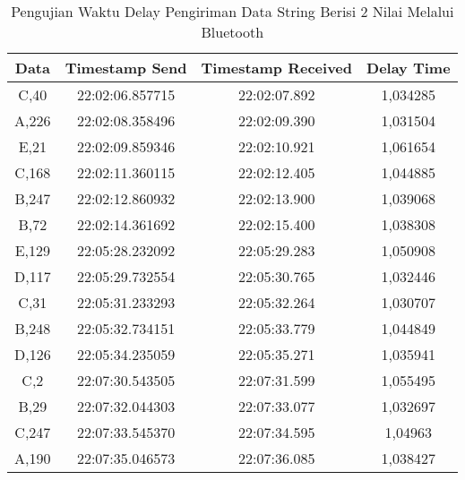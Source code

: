 \begin{table}[]
\centering
  \caption{Pengujian Waktu Delay Pengiriman Data String Berisi 2 Nilai Melalui Bluetooth}
  \label{tbl:delayBluetooth}
  \begin{tabular}{|ccc|c|}
  \hline
  \multicolumn{1}{|c|}{Data}  & \multicolumn{1}{c|}{Timestamp Send}  & Timestamp Received & Delay Time  \\ \hline
  \multicolumn{1}{|c|}{C,40}  & \multicolumn{1}{c|}{22:02:06.857715} & 22:02:07.892       & 1,034285    \\ \hline
  \multicolumn{1}{|c|}{A,226} & \multicolumn{1}{c|}{22:02:08.358496} & 22:02:09.390       & 1,031504    \\ \hline
  \multicolumn{1}{|c|}{E,21}  & \multicolumn{1}{c|}{22:02:09.859346} & 22:02:10.921       & 1,061654    \\ \hline
  \multicolumn{1}{|c|}{C,168} & \multicolumn{1}{c|}{22:02:11.360115} & 22:02:12.405       & 1,044885    \\ \hline
  \multicolumn{1}{|c|}{B,247} & \multicolumn{1}{c|}{22:02:12.860932} & 22:02:13.900       & 1,039068    \\ \hline
  \multicolumn{1}{|c|}{B,72}  & \multicolumn{1}{c|}{22:02:14.361692} & 22:02:15.400       & 1,038308    \\ \hline
  \multicolumn{1}{|c|}{E,129} & \multicolumn{1}{c|}{22:05:28.232092} & 22:05:29.283       & 1,050908    \\ \hline
  \multicolumn{1}{|c|}{D,117} & \multicolumn{1}{c|}{22:05:29.732554} & 22:05:30.765       & 1,032446    \\ \hline
  \multicolumn{1}{|c|}{C,31}  & \multicolumn{1}{c|}{22:05:31.233293} & 22:05:32.264       & 1,030707    \\ \hline
  \multicolumn{1}{|c|}{B,248} & \multicolumn{1}{c|}{22:05:32.734151} & 22:05:33.779       & 1,044849    \\ \hline
  \multicolumn{1}{|c|}{D,126} & \multicolumn{1}{c|}{22:05:34.235059} & 22:05:35.271       & 1,035941    \\ \hline
  \multicolumn{1}{|c|}{C,2}   & \multicolumn{1}{c|}{22:07:30.543505} & 22:07:31.599       & 1,055495    \\ \hline
  \multicolumn{1}{|c|}{B,29}  & \multicolumn{1}{c|}{22:07:32.044303} & 22:07:33.077       & 1,032697    \\ \hline
  \multicolumn{1}{|c|}{C,247} & \multicolumn{1}{c|}{22:07:33.545370} & 22:07:34.595       & 1,04963     \\ \hline
  \multicolumn{1}{|c|}{A,190} & \multicolumn{1}{c|}{22:07:35.046573} & 22:07:36.085       & 1,038427    \\ \hline

\end{tabular}
\end{table}
